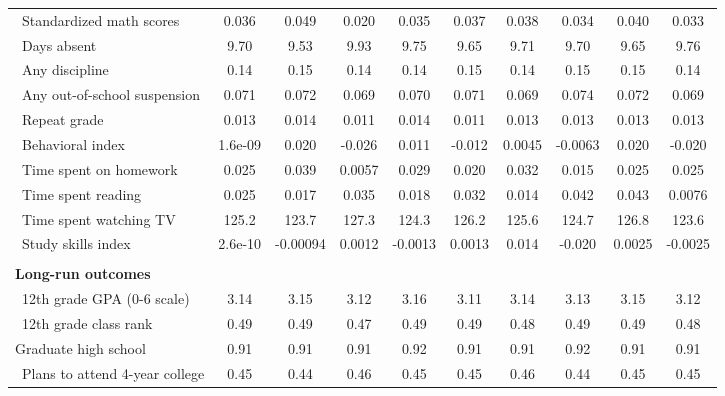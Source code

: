 {\begin{tabular}{l*{9}{c}}
\ Standardized math scores&       0.036&       0.049&       0.020&       0.035&       0.037&       0.038&       0.034&       0.040&       0.033\\
\ Days absent&        9.70&        9.53&        9.93&        9.75&        9.65&        9.71&        9.70&        9.65&        9.76\\
\ Any discipline&        0.14&        0.15&        0.14&        0.14&        0.15&        0.14&        0.15&        0.15&        0.14\\
\ Any out-of-school suspension&       0.071&       0.072&       0.069&       0.070&       0.071&       0.069&       0.074&       0.072&       0.069\\
\ Repeat grade&       0.013&       0.014&       0.011&       0.014&       0.011&       0.013&       0.013&       0.013&       0.013\\
\ Behavioral index&     1.6e-09&       0.020&      -0.026&       0.011&      -0.012&      0.0045&     -0.0063&       0.020&      -0.020\\
\ Time spent on homework&       0.025&       0.039&      0.0057&       0.029&       0.020&       0.032&       0.015&       0.025&       0.025\\
\ Time spent reading&       0.025&       0.017&       0.035&       0.018&       0.032&       0.014&       0.042&       0.043&      0.0076\\
\ Time spent watching TV&       125.2&       123.7&       127.3&       124.3&       126.2&       125.6&       124.7&       126.8&       123.6\\
\ Study skills index&     2.6e-10&    -0.00094&      0.0012&     -0.0013&      0.0013&       0.014&      -0.020&      0.0025&     -0.0025\\
\\ \textbf{Long-run outcomes}\\ \ 12th grade GPA (0-6 scale)&        3.14&        3.15&        3.12&        3.16&        3.11&        3.14&        3.13&        3.15&        3.12\\
\ 12th grade class rank&        0.49&        0.49&        0.47&        0.49&        0.49&        0.48&        0.49&        0.49&        0.48\\
Graduate high school&        0.91&        0.91&        0.91&        0.92&        0.91&        0.91&        0.92&        0.91&        0.91\\
\ Plans to attend 4-year college&        0.45&        0.44&        0.46&        0.45&        0.45&        0.46&        0.44&        0.45&        0.45\\

\end{tabular}}
